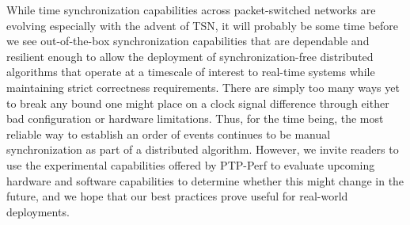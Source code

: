
While time synchronization capabilities across packet-switched networks are evolving especially with the advent of TSN, it will probably be some time before we see out-of-the-box synchronization capabilities that are dependable and resilient enough to allow the deployment of synchronization-free distributed algorithms that operate at a timescale of interest to real-time systems while maintaining strict correctness requirements. There are simply too many ways yet to break any bound one might place on a clock signal difference through either bad configuration or hardware limitations. Thus, for the time being, the most reliable way to establish an order of events continues to be manual synchronization as part of a distributed algorithm. However, we invite readers to use the experimental capabilities offered by PTP-Perf to evaluate upcoming hardware and software capabilities to determine whether this might change in the future, and we hope that our best practices prove useful for real-world deployments.
